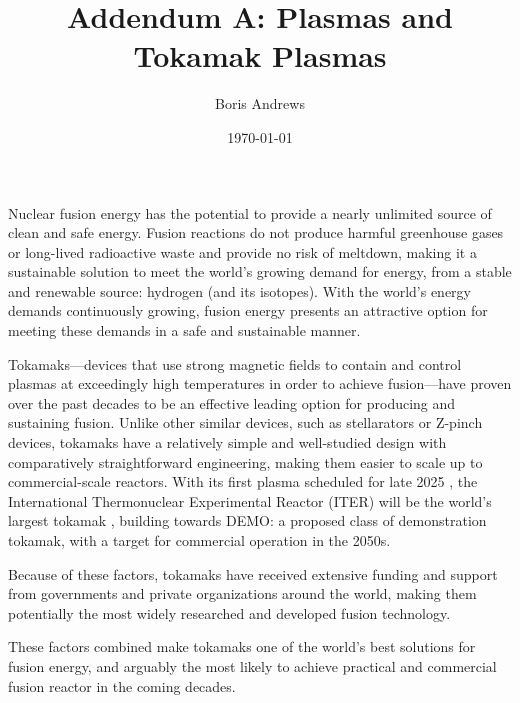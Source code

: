 \documentclass[12pt, a4paper]{article}
\title{Addendum A: Plasmas and Tokamak Plasmas}
\author{Boris Andrews}
\affil{Mathematical Institute, University of Oxford}
\date{\today}
\begin{document}
    \maketitle
    
    
    \tableofcontents


    Nuclear fusion energy has the potential to provide a nearly unlimited source of clean and safe energy. Fusion reactions do not produce harmful greenhouse gases or long-lived radioactive waste and provide no risk of meltdown, making it a sustainable solution to meet the world's growing demand for energy, from a stable and renewable source: hydrogen (and its isotopes). With the world's energy demands continuously growing, fusion energy presents an attractive option for meeting these demands in a safe and sustainable manner.

    Tokamaks---devices that use strong magnetic fields to contain and control plasmas at exceedingly high temperatures in order to achieve fusion---have proven over the past decades to be an effective leading option for producing and sustaining fusion. Unlike other similar devices, such as stellarators or Z-pinch devices, tokamaks have a relatively simple and well-studied  design with comparatively straightforward engineering, making them easier to scale up to commercial-scale reactors. With its first plasma scheduled for late 2025 \cite{ITER_schedule}, the International Thermonuclear Experimental Reactor (ITER) will be the world's largest tokamak \cite{Meade_2009, ITER_plan}, building towards DEMO: a proposed class of demonstration tokamak, with a target for commercial operation in the 2050s.
    
    Because of these factors, tokamaks have received extensive funding and support from governments and private organizations around the world, making them potentially the most widely researched and developed fusion technology.
    
    These factors combined make tokamaks one of the world's best solutions for fusion energy, and arguably the most likely to achieve practical and commercial fusion reactor in the coming decades.
\end{document}
